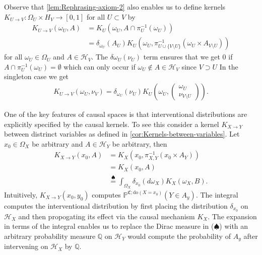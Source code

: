\documentclass[../main.tex]{subfiles}
\begin{document}
    \begin{rem}
        \label{rem:Kernels between subsets of variables}
            Observe that \autoref{lem:Rephrasing-axiom-2} also enables us to define kernels ${K_{U\to V}:\Omega_U\times H_V\to [0,1]}$ for all ${U\subset V}$ by
            \begin{align*}
                K_{U\to V}(\omega_U, A) &= K_U(\omega_U, A\cap\pi_U^{-1}(\omega_U))\\
                &= \delta_{\omega_U}(A_U)K_U(\omega_U, \pi^{-1}_{U\cup \{V\setminus U\}}(\omega_U\times A_{V\setminus U}))
            \end{align*}
            for all ${\omega_U\in \Omega_U}$ and ${A\in \mathcal{H}_V}$. The ${\delta{\omega_U}(\nu_U)}$ term ensures that we get ${0}$ if ${A\cap \pi^{-1}_U(\omega_U)=\emptyset}$ which can only occur if ${\omega_U\notin A\in \mathcal{H}_V}$ since ${V\supset U}$ In the singleton case we get 
            \begin{align*}
                K_{U\to V}(\omega_U, \nu_V) = \delta_{\omega_U}(\nu_U)K_U(\omega_U, \begin{pmatrix}
                    \omega_U \\ \nu_{V\setminus U}
                \end{pmatrix}). 
            \end{align*}
        \end{rem}
    \begin{rem}
    \label{rem:Causal-mechanisms-encode-interventional-distributions}
        One of the key features of causal spaces is that interventional distributions are explicitly specified by the causal kernels. To see this consider a kernel ${K_{X\to Y}}$ between distrinct variables as defined in \autoref{cor:Kernels-between-variables}. Let ${x_0\in \Omega_X}$ be arbitrary and ${A\in \mathcal{H}_Y}$ be arbitrary, then 
        \begin{align*}
            K_{X\to Y}(x_0, A) &= K_X(x_0, \pi_{X,Y}^{-1}(x_0\times A_Y))\\
                               &= K_X(x_0, A)\\
                               &\stackrel{\spadesuit}{=} \int_{\Omega_X}\delta_{x_0}(d\omega_X)K_X(\omega_X,B). 
        \end{align*}
        Intuitively, ${K_{X\to Y}(x_0, y_0)}$ computes ${\mathbb{P}^{\mathfrak{C};\text{do}(X=x_0)}(Y\in A_y)}$. The integral computes the interventional distribution by first placing the distribution ${\delta_{x_0}}$ on ${\mathcal{H}_X}$ and then propogating its effect via the causal mechanism ${K_X}$. The expansion in terms of the integral enables us to replace the Dirac measure in ($\spadesuit$) with an arbitrary probability measure ${\mathbb{Q}}$ on ${\mathcal{H}_Y}$ would compute the probability of ${A_y}$ after intervening on ${\mathcal{H}_X}$ by ${\mathbb{Q}}$.
    \end{rem}
\end{document}
